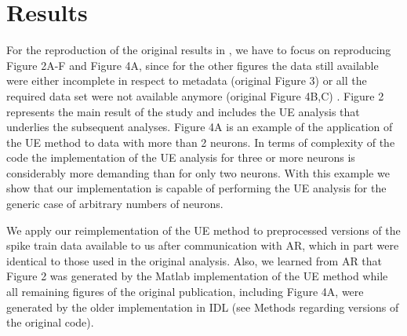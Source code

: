 \documentclass[10pt,a4paper,onecolumn]{article}
\begin{document}
\section{Results}\label{results}

For the reproduction of the original results in \autocite{Riehle97}, we
have to focus on reproducing Figure 2A-F and Figure 4A, since for the
other figures the data still available were either incomplete in respect
to metadata (original Figure 3) or all the required data set were not
available anymore (original Figure 4B,C) . Figure 2 represents the main
result of the study and includes the UE analysis that underlies the
subsequent analyses. Figure 4A is an example of the application of the
UE method to data with more than 2 neurons. In terms of complexity of
the code the implementation of the UE analysis for three or more neurons
is considerably more demanding than for only two neurons. With this
example we show that our implementation is capable of performing the UE
analysis for the generic case of arbitrary numbers of neurons.

We apply our reimplementation of the UE method to preprocessed versions
of the spike train data available to us after communication with AR,
which in part were identical to those used in the original analysis.
Also, we learned from AR that Figure 2 was generated by the Matlab
implementation of the UE method while all remaining figures of the
original publication, including Figure 4A, were generated by the older
implementation in IDL (see Methods regarding versions of the original
code).
\end{document}
